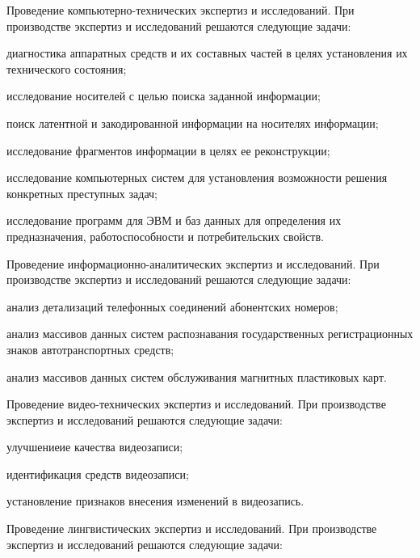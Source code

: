 \begin{enumerate*}
\item Проведение компьютерно-технических экспертиз и исследований. При производстве экспертиз и исследований решаются следующие задачи:
	\begin{itemize*}
		\item диагностика аппаратных средств и их составных частей в целях установления их технического состояния;
		\item исследование носителей с целью поиска заданной информации;
		\item поиск латентной и закодированной информации на носителях информации;
		\item исследование фрагментов информации в целях ее реконструкции;
		\item исследование компьютерных систем для установления возможности решения конкретных преступных задач;
		\item исследование программ для ЭВМ и баз данных для определения их предназначения, работоспособности и потребительских свойств.
	\end{itemize*}
	\item Проведение информационно-аналитических экспертиз и исследований. При производстве экспертиз и исследований решаются следующие задачи:
	\begin{itemize*}
		\item анализ детализаций телефонных соединений абонентских номеров;
		\item анализ массивов данных систем распознавания государственных регистрационных знаков автотранспортных средств;
		\item анализ массивов данных систем обслуживания магнитных пластиковых карт.
	\end{itemize*}
	\item Проведение	видео-технических	экспертиз	и	исследований.	При
производстве экспертиз и исследований решаются следующие задачи:
	\begin{itemize*}
		\item улучшениеие качества видеозаписи;
		\item идентификация средств видеозаписи;
		\item установление признаков внесения изменений в видеозапись.
	\end{itemize*}
	\item Проведение	лингвистических	экспертиз	и	исследований.	При
производстве экспертиз и исследований решаются следующие задачи:
	\begin{itemize*}

\end{itemize*}
\end{enumerate*}
